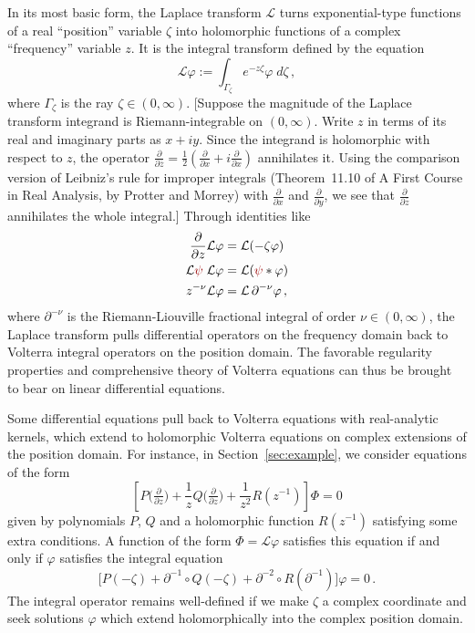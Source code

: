\documentclass[final]{siamart220329}
\newcommand{\laplace}{\mathcal{L}}
\newenvironment{verify}{\color{veriforest}}{\color{black}}
\newenvironment{revtwo}{\color{revred}}{\color{black}}
\newcommand{\revtwotext}[1]{\textcolor{revred}{#1}}
\newenvironment{revtwo}{}{}
\newcommand{\revtwotext}[1]{#1}
\begin{document}
\begin{revtwo}
In its most basic form, the Laplace transform $\laplace$ turns exponential-type functions of a real ``position'' variable $\zeta$ into holomorphic functions of a complex ``frequency'' variable $z$. It is the integral transform defined by the equation
\[ \laplace \varphi := \int_{\Gamma_\zeta} e^{-z\zeta} \varphi\;d\zeta\,, \]
where $\Gamma_\zeta$ is the ray $\zeta \in (0, \infty)$.     
\end{revtwo}
\begin{verify}[Suppose the magnitude of the Laplace transform integrand is Riemann-integrable on $(0, \infty)$. Write $z$ in terms of its real and imaginary parts as $x + iy$. Since the integrand is holomorphic with respect to $z$, the operator $\frac{\partial}{\partial\overline{z}} = \frac{1}{2}\left(\frac{\partial}{\partial x} + i\frac{\partial}{\partial x}\right)$ annihilates it. Using the comparison version of Leibniz's rule for improper integrals (Theorem~11.10 of A First Course in Real Analysis, by Protter and Morrey) with $\frac{\partial}{\partial x}$ and $\frac{\partial}{\partial y}$, we see that $\frac{\partial}{\partial\overline{z}}$ annihilates the whole integral.]\end{verify} Through identities like
\begin{align*}
\frac{\partial}{\partial z} \laplace \varphi & = \laplace(-\zeta\varphi) \\
\laplace \revtwotext{\psi}\;\laplace\varphi & = \laplace(\revtwotext{\psi} * \varphi) \\
z^{-\nu} \laplace \varphi & = \laplace\,\partial^{-\nu} \varphi\,,
\end{align*}
where $\partial^{-\nu}$ is the Riemann-Liouville fractional integral of order $\nu \in (0, \infty)$, the Laplace transform pulls differential operators on the frequency domain back to Volterra integral operators on the position domain. The favorable regularity properties and comprehensive theory of Volterra equations can thus be brought to bear on linear differential equations.

Some differential equations pull back to Volterra equations with real-analytic kernels, which extend to holomorphic Volterra equations on complex extensions of the position domain. For instance, in Section~\ref{sec:example}, we consider equations of the form
\begin{equation}\label{eqn:intro-level-1}
\left[ P\big(\tfrac{\partial}{\partial z}\big) + \frac{1}{z} Q\big(\tfrac{\partial}{\partial z}\big) + \frac{1}{z^2} R(z^{-1}) \right] \Phi = 0
\end{equation}
given by polynomials $P$, $Q$ and a holomorphic function $R(z^{-1})$ satisfying some extra conditions. A function of the form $\Phi = \laplace \varphi$ satisfies this equation if and only if $\varphi$ satisfies the integral equation
\begin{equation}\label{eqn:intro-use-dict}
\big[ P(-\zeta)+\partial^{-1}\circ Q(-\zeta)+\partial^{-2}\circ R(\partial^{-1}) \big] \varphi = 0\,.
\end{equation}
The integral operator remains well-defined if we make $\zeta$ a complex coordinate and seek solutions $\varphi$ which extend holomorphically into the complex position domain.
\end{document}
